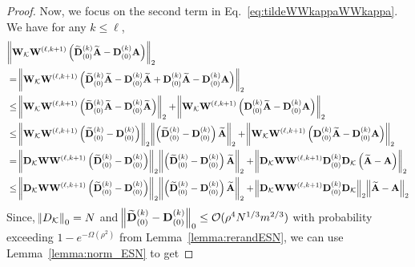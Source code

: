 \begin{proof}
	Now, we focus on the second term in  Eq.~\ref{eq:tildeWWkappaWWkappa}. We have for any $k \le \ell$,
	\begingroup \allowdisplaybreaks
	\begin{align*}
		&\norm{\mathbf{W}_{\mathcal{K}} \mathbf{W}^{(\ell, k+1)} \left(\widetilde{\mathbf{D}}_{(0)}^{(k)} \widetilde{\mathbf{A}} - \mathbf{D}_{(0)}^{(k)} \mathbf{A}\right)}_2 \\& =
		\norm{\mathbf{W}_{\mathcal{K}} \mathbf{W}^{(\ell, k+1)} \left(\widetilde{\mathbf{D}}_{(0)}^{(k)} \widetilde{\mathbf{A}} -  \mathbf{D}_{(0)}^{(k)} \widetilde{\mathbf{A}} + \mathbf{D}_{(0)}^{(k)} \widetilde{\mathbf{A}} - \mathbf{D}_{(0)}^{(k)} \mathbf{A}\right)}_2 \\&
		\le \norm{\mathbf{W}_{\mathcal{K}} \mathbf{W}^{(\ell, k+1)} \left(\widetilde{\mathbf{D}}_{(0)}^{(k)} \widetilde{\mathbf{A}} -  \mathbf{D}_{(0)}^{(k)} \widetilde{\mathbf{A}} \right)}_2 + \norm{\mathbf{W}_{\mathcal{K}} \mathbf{W}^{(\ell, k+1)} \left( \mathbf{D}_{(0)}^{(k)} \widetilde{\mathbf{A}} - \mathbf{D}_{(0)}^{(k)} \mathbf{A}\right)}_2 \\&
		\le \norm{\mathbf{W}_{\mathcal{K}} \mathbf{W}^{(\ell, k+1)} \left(\widetilde{\mathbf{D}}_{(0)}^{(k)}  -  \mathbf{D}_{(0)}^{(k)}  \right)}_2 \norm{\left(\widetilde{\mathbf{D}}_{(0)}^{(k)}  -  \mathbf{D}_{(0)}^{(k)}  \right)\widetilde{\mathbf{A}}}_2 + \norm{\mathbf{W}_{\mathcal{K}} \mathbf{W}^{(\ell, k+1)} \left( \mathbf{D}_{(0)}^{(k)} \widetilde{\mathbf{A}} - \mathbf{D}_{(0)}^{(k)} \mathbf{A}\right)}_2 \\&
		=  \norm{\mathbf{D}_{\mathcal{K}} \mathbf{W} \mathbf{W}^{(\ell, k+1)} \left(\widetilde{\mathbf{D}}_{(0)}^{(k)}  -  \mathbf{D}_{(0)}^{(k)}  \right)}_2 \norm{\left(\widetilde{\mathbf{D}}_{(0)}^{(k)}  -  \mathbf{D}_{(0)}^{(k)}  \right)\widetilde{\mathbf{A}}}_2 + \norm{\mathbf{D}_{\mathcal{K}} \mathbf{W} \mathbf{W}^{(\ell, k+1)} \mathbf{D}_{(0)}^{(k)} \mathbf{D}_{\mathcal{K}} \left(  \widetilde{\mathbf{A}} -  \mathbf{A}\right)}_2 \\& 
		\le \norm{\mathbf{D}_{\mathcal{K}} \mathbf{W} \mathbf{W}^{(\ell, k+1)} \left(\widetilde{\mathbf{D}}_{(0)}^{(k)}  -  \mathbf{D}_{(0)}^{(k)}  \right)}_2 \norm{\left(\widetilde{\mathbf{D}}_{(0)}^{(k)}  -  \mathbf{D}_{(0)}^{(k)}  \right)\widetilde{\mathbf{A}}}_2 + \norm{\mathbf{D}_{\mathcal{K}} \mathbf{W} \mathbf{W}^{(\ell, k+1)} \mathbf{D}_{(0)}^{(k)} \mathbf{D}_{\mathcal{K}}}_2 \norm{ \widetilde{\mathbf{A}} -  \mathbf{A} }_2
	\end{align*}
	\endgroup
	Since, $\norm{D_{\mathcal{K}}}_0 = N$ and $\norm{\widetilde{\mathbf{D}}_{(0)}^{(k)}  -  \mathbf{D}_{(0)}^{(k)} }_0 \le \mathcal{O}(\rho^4 N^{1/3} m^{2/3})$ with probability exceeding $1 - e^{-\Omega(\rho^2)}$ from Lemma~\ref{lemma:rerandESN}, we can use Lemma~\ref{lemma:norm_ESN} to get

\end{proof}
